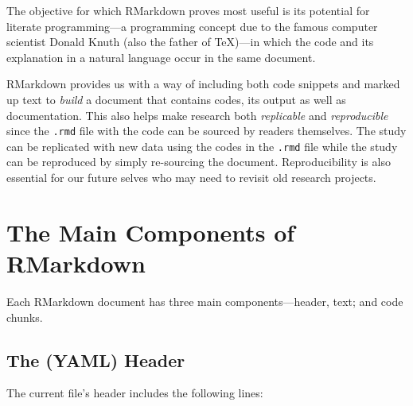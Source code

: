 \documentclass[11pt,]{article}
\begin{document}
The objective for which RMarkdown proves most useful is its potential
for literate programming---a programming concept due to the famous
computer scientist Donald Knuth (also the father of TeX)---in which the
code and its explanation in a natural language occur in the same
document.

RMarkdown provides us with a way of including both code snippets and
marked up text to \emph{build} a document that contains codes, its
output as well as documentation. This also helps make research both
\emph{replicable} and \emph{reproducible} since the \texttt{.rmd} file
with the code can be sourced by readers themselves. The study can be
replicated with new data using the codes in the \texttt{.rmd} file while
the study can be reproduced by simply re-sourcing the document.
Reproducibility is also essential for our future selves who may need to
revisit old research projects.

\section{The Main Components of
RMarkdown}\label{the-main-components-of-rmarkdown}

Each RMarkdown document has three main components---header, text; and
code chunks.

\subsection{The (YAML) Header}\label{the-yaml-header}

The current file's header includes the following lines:
\end{document}
